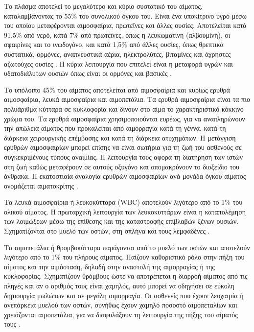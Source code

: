 	Το πλάσμα αποτελεί το μεγαλύτερο και κύριο συστατικό του αίματος, καταλαμβάνοντας το 55\% του συνολικού όγκου του. Είναι ένα υποκίτρινο υγρό μέσω του οποίου μεταφέρονται αιμοσφαίρια, πρωτεΐνες και άλλες ουσίες. Αποτελείται κατά 91,5\% από νερό, κατά 7\% από πρωτεΐνες, όπως η λευκωματίνη (αλβουμίνη), οι σφαιρίνες και το ινωδογόνο, και κατά 1,5\% από άλλες ουσίες, όπως θρεπτικά συστατικά, ορμόνες, αναπνευστικά αέρια, ηλεκτρολύτες, βιταμίνες και άχρηστες αζωτούχες ουσίες \cite{bloodPlasma}. Η κύρια λειτουργία που επιτελεί είναι η μεταφορά υγρών και υδατοδιάλυτων ουσιών όπως είναι οι ορμόνες και βασικές .

	Το υπόλοιπο 45\% του αίματος αποτελείται από αιμοσφαίρια και κυρίως ερυθρά αιμοσφαίρια, λευκά αιμοσφαίρια και αιμοπετάλια. Τα ερυθρά αιμοσφαίρια είναι τα πιο πολυάριθμα κύτταρα σε κυκλοφορία και δίνουν στο αίμα το χαρακτηριστικό κόκκινο χρώμα του. Τα ερυθρά αιμοσφαίρια χρησιμοποιούνται ευρέως, για να αναπληρώνουν την απώλεια αίματος που προκαλείται από αιμορραγία κατά τη γέννα, κατά τη διάρκεια χειρουργικής επέμβασης και κατά τη διάρκεια ατυχημάτων. Η μετάγγιση ερυθρών αιμοσφαιρίων μπορεί επίσης να είναι σωτήρια για τη ζωή του ασθενούς σε συγκεκριμένους τύπους αναιμίας. Η λειτουργία τους αφορά τη διατήρηση των ιστών στη ζωή καθώς μεταφέρουν σε αυτούς οξυγόνο και απομακρύνουν το διοξείδιο του άνθρακα. Η εκατοστιαία αναλογία ερυθρών αιμοσφαιρίων ανά μονάδα όγκου αίματος ονομάζεται αιματοκρίτης \cite{hematologyBasics}.
	
	Τα λευκά αιμοσφαίρια ή λευκοκύτταρα (WBC) αποτελούν λιγότερο από το 1\% του ολικού αίματος. Η πρωταρχική λειτουργία των λευκοκυττάρων είναι η καταπολέμηση των λοιμώξεων μέσω της επίθεσης και της καταστροφής επιβλαβών ξένων ουσιών. Σχηματίζονται στο μυελό των οστών, στη σπλήνα και τους λεμφαδένες \cite{whiteBloodCells}.
	
	Τα αιμοπετάλια ή θρομβοκύτταρα παράγονται από το μυελό των οστών και αποτελούν λιγότερο από το 1\% του πλήρους αίματος. Παίζουν καθοριστικό ρόλο στην πήξη του αίματος και την αιμόσταση, δηλαδή στην αναστολή της αιμορραγίας ή της κυκλοφορίας. Σχηματίζουν θρόμβους ώστε να αποτρέπεται η διαρροή αίματος από τις πληγές και αν ο αριθμός τους είναι χαμηλός, αυτό μπορεί να οδηγήσει σε εύκολη δημιουργία μωλώπων και σε μεγάλη αιμορραγία. Οι ασθενείς που έχουν λευχαιμία ή ανεπάρκεια μυελού των οστών, συνήθως έχουν χαμηλό ποσοστό αιμοπεταλίων και χρειάζονται αιμοπετάλια, για να διαφυλάξουν τη λειτουργία της πήξης του αίματός τους \cite{hematologyBasics}.
	
